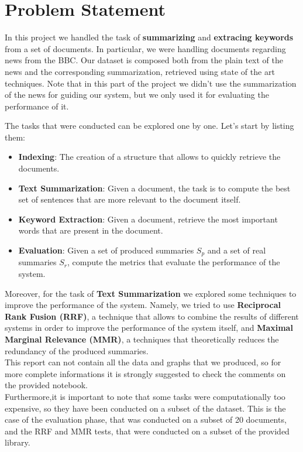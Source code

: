 \section{Problem Statement}
In this project we handled the task of \textbf{summarizing} and \textbf{extracing keywords} from a set of documents. In particular, 
we were handling documents regarding news from the BBC.
Our dataset is composed both from the plain text of the news and the corresponding summarization, retrieved using state of the art 
techniques. Note that in this part of the project we didn't use the summarization
of the news for guiding our system, but we only used 
it for evaluating the performance of it.

The tasks that were conducted can be explored one by one. Let's start by 
listing them:

\begin{itemize}
    \item \textbf{Indexing}: The creation of a structure 
    that allows to quickly retrieve the documents.
    \item \textbf{Text Summarization}: Given a document, the task is to 
    compute the best set of sentences that are more relevant to the document itself.
    \item \textbf{Keyword Extraction}: Given a document, retrieve the
    most important words that are present in the document.
    \item \textbf{Evaluation}: Given a set of produced summaries $S_p$ and a set of real summaries $S_r$,
    compute the metrics that evaluate the performance of the system.
\end{itemize}

Moreover, for the task of \textbf{Text Summarization} we explored 
some techniques to improve the performance of the system. Namely, 
we tried to use \textbf{Reciprocal Rank Fusion (RRF)}, a technique that
allows to combine the results of different systems in order to
improve the performance of the system itself, and \textbf{Maximal Marginal Relevance (MMR)}, a techniques that
theoretically reduces the redundancy of the produced summaries. \\
This report can not contain all the data and graphs that we produced, so for more complete informations it is strongly suggested to check the comments on the provided notebook.\\
Furthermore,it is important to note that some tasks were computationally too expensive, so they have been conducted on a subset of the dataset. This is the case of the evaluation phase, that was conducted on a subset of 20 documents, and the RRF and MMR tests, that were conducted on a subset of the provided library.
